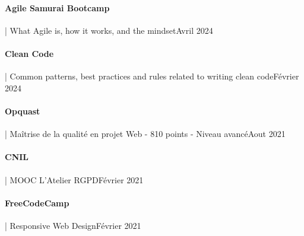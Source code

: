 \documentclass{article}
\begin{document}
\paragraph{Agile Samurai Bootcamp} | What Agile is, how it works, and the mindset\hspace*{\fill}Avril 2024
\paragraph{Clean Code} | Common patterns, best practices and rules related to writing clean code\hspace*{\fill}Février 2024
\paragraph{Opquast} | Maîtrise de la qualité en projet Web - 810 points - Niveau avancé\hspace*{\fill}Aout 2021
\paragraph{CNIL} | MOOC L'Atelier RGPD\hspace*{\fill}Février 2021
\paragraph{FreeCodeCamp} | Responsive Web Design\hspace*{\fill}Février 2021
\end{document}
